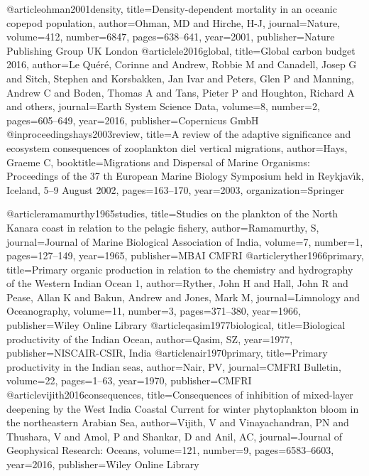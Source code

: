 @article{ohman2001density,
	title={Density-dependent mortality in an oceanic copepod population},
	author={Ohman, MD and Hirche, H-J},
	journal={Nature},
	volume={412},
	number={6847},
	pages={638--641},
	year={2001},
	publisher={Nature Publishing Group UK London}
}
@article{le2016global,
	title={Global carbon budget 2016},
	author={Le Qu{\'e}r{\'e}, Corinne and Andrew, Robbie M and Canadell, Josep G and Sitch, Stephen and Korsbakken, Jan Ivar and Peters, Glen P and Manning, Andrew C and Boden, Thomas A and Tans, Pieter P and Houghton, Richard A and others},
	journal={Earth System Science Data},
	volume={8},
	number={2},
	pages={605--649},
	year={2016},
	publisher={Copernicus GmbH}
}
@inproceedings{hays2003review,
	title={A review of the adaptive significance and ecosystem consequences of zooplankton diel vertical migrations},
	author={Hays, Graeme C},
	booktitle={Migrations and Dispersal of Marine Organisms: Proceedings of the 37 th European Marine Biology Symposium held in Reykjav{\'\i}k, Iceland, 5--9 August 2002},
	pages={163--170},
	year={2003},
	organization={Springer}
}


@article{ramamurthy1965studies,
	title={Studies on the plankton of the North Kanara coast in relation to the pelagic fishery},
	author={Ramamurthy, S},
	journal={Journal of Marine Biological Association of India},
	volume={7},
	number={1},
	pages={127--149},
	year={1965},
	publisher={MBAI CMFRI}
}
@article{ryther1966primary,
	title={Primary organic production in relation to the chemistry and hydrography of the Western Indian Ocean 1},
	author={Ryther, John H and Hall, John R and Pease, Allan K and Bakun, Andrew and Jones, Mark M},
	journal={Limnology and Oceanography},
	volume={11},
	number={3},
	pages={371--380},
	year={1966},
	publisher={Wiley Online Library}
}
@article{qasim1977biological,
	title={Biological productivity of the Indian Ocean},
	author={Qasim, SZ},
	year={1977},
	publisher={NISCAIR-CSIR, India}
}
@article{nair1970primary,
	title={Primary productivity in the Indian seas},
	author={Nair, PV},
	journal={CMFRI Bulletin},
	volume={22},
	pages={1--63},
	year={1970},
	publisher={CMFRI}
}
@article{vijith2016consequences,
	title={Consequences of inhibition of mixed-layer deepening by the West India Coastal Current for winter phytoplankton bloom in the northeastern Arabian Sea},
	author={Vijith, V and Vinayachandran, PN and Thushara, V and Amol, P and Shankar, D and Anil, AC},
	journal={Journal of Geophysical Research: Oceans},
	volume={121},
	number={9},
	pages={6583--6603},
	year={2016},
	publisher={Wiley Online Library}
}

